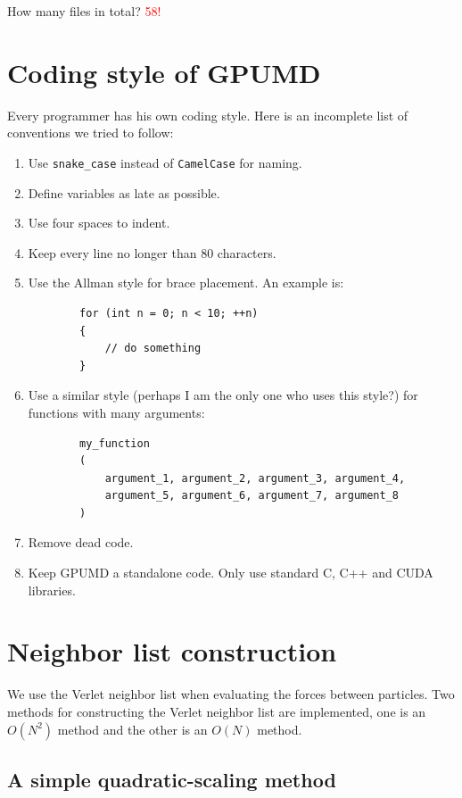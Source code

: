 \documentclass[12pt,a4paper]{report}
\begin{document}
How many files in total? \textcolor{red}{58!}


\section{Coding style of GPUMD}

Every programmer has his own coding style. Here is an incomplete list of conventions we tried to follow:
\begin{enumerate}
\item Use \verb"snake_case" instead of \verb"CamelCase" for naming.
\item Define variables as late as possible.
\item Use four spaces to indent. 
\item Keep every line no longer than 80 characters.
\item Use the Allman style for brace placement. An example is:
    \begin{verbatim}
        for (int n = 0; n < 10; ++n) 
        {
            // do something
        }
    \end{verbatim}
\item Use a similar style (perhaps I am the only one who uses this style?) for functions with many arguments:
    \begin{verbatim}
        my_function
        (
            argument_1, argument_2, argument_3, argument_4, 
            argument_5, argument_6, argument_7, argument_8
        )
    \end{verbatim}
\item Remove dead code.
\item Keep GPUMD a standalone code. Only use standard C, C++ and CUDA libraries.
\end{enumerate}


\section{Neighbor list construction}


We use the Verlet neighbor list when evaluating the forces between particles. Two methods for constructing the Verlet neighbor list are implemented, one is an $O(N^2)$ method and the other is an $O(N)$ method.


\subsection{A simple quadratic-scaling method}
\end{document}
